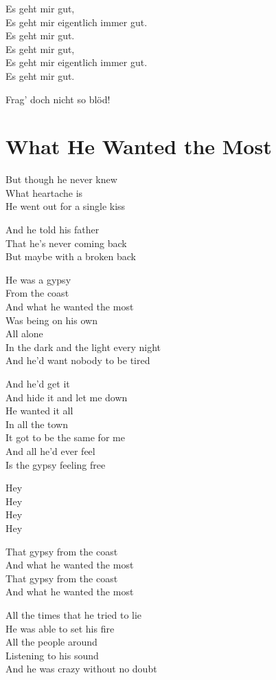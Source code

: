 \documentclass[]{book}
\begin{document}
Es geht mir gut,\\
Es geht mir eigentlich immer gut.\\
Es geht mir gut.\\
Es geht mir gut,\\
Es geht mir eigentlich immer gut.\\
Es geht mir gut.

Frag' doch nicht so blöd!

\hypertarget{what-he-wanted-the-most-1}{%
\section{What He Wanted the Most}\label{what-he-wanted-the-most-1}}

But though he never knew\\
What heartache is\\
He went out for a single kiss

And he told his father\\
That he's never coming back\\
But maybe with a broken back

He was a gypsy\\
From the coast\\
And what he wanted the most\\
Was being on his own\\
All alone\\
In the dark and the light every night\\
And he'd want nobody to be tired

And he'd get it\\
And hide it and let me down\\
He wanted it all\\
In all the town\\
It got to be the same for me\\
And all he'd ever feel\\
Is the gypsy feeling free

Hey\\
Hey\\
Hey\\
Hey

That gypsy from the coast\\
And what he wanted the most\\
That gypsy from the coast\\
And what he wanted the most

All the times that he tried to lie\\
He was able to set his fire\\
All the people around\\
Listening to his sound\\
And he was crazy without no doubt
\end{document}
